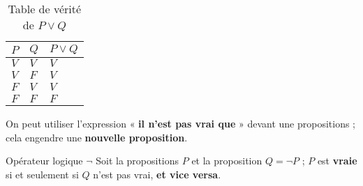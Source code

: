 \documentclass[16pt]{report}
\begin{document}
\begin{multicols*}{2}
                \begin{table}[H]
                  \caption {Table de vérité de $P \lor Q$}
                  \begin{center}
                   \renewcommand{\arraystretch}{1.5}
                   \selectfont
                    \normalsize
                        \begin{tabular}{|l|l||l|}
                        \arrayrulecolor{blue}\hline
                        \rowcolor{lightBlue}
                        \textcolor{myb}{$P$} & \textcolor{myb}{$Q$} & \textcolor{myb}{$P \lor Q$}   
                        \\
                        \hline
                        \hline
                        \arrayrulecolor{black}
                        $V$ & $V$ & \cellcolor{myg} $V$
                        \\
                        \hline
                        $V$ & $F$ & \cellcolor{myg} $V$ 
                        \\
                        \hline
                        $F$ & $V$ & \cellcolor{myg} $V$ 
                        \\
                        \hline 
                        $F$ & $F$ & \cellcolor{myr} $F$ 
                        \\ 
                        \hline
                        \end{tabular}
                \end{center}
                \end{table}



                On peut utiliser l'expression « \textbf{il n'est pas vrai que} » devant une propositions ; 
                cela engendre une \textbf{nouvelle proposition}. 
                \begin{Syntaxe}{Opérateur logique $\neg$ }{}
                   Soit la propositions $P$ et la proposition $Q = \neg P$ ; $P$ est \textbf{vraie} si 
                   et seulement si $Q$ n'est pas vrai, \textbf{et vice versa}.
                \end{Syntaxe}




\end{multicols*}
\end{document}
